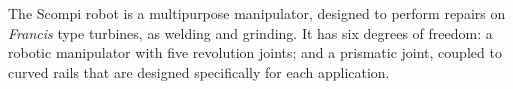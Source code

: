 
The Scompi robot \citep{scompi} %
is a multipurpose manipulator, designed to perform repairs on \textit{Francis}
type turbines, as welding and grinding. It has six degrees of freedom: a robotic
manipulator with five revolution joints; and a prismatic joint, coupled to
curved rails that are designed specifically for each application.



